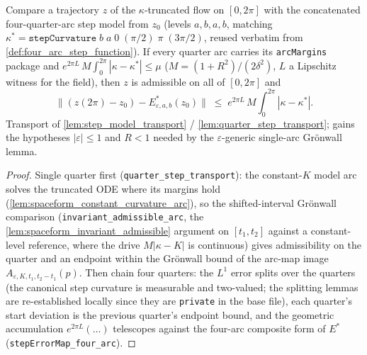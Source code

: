 \begin{lemma}
  \label{lem:spaceform_step_model_transport}
  Compare a trajectory $z$ of the $\kappa$-truncated flow on $[0,2\pi]$ with
  the concatenated four-quarter-arc step model from $z_0$ (levels $a,b,a,b$,
  matching $\kappa^\ast=\mathtt{stepCurvature}\;b\;a\;0\;(\pi/2)\;\pi\;
  (3\pi/2)$, reused verbatim from \cref{def:four_arc_step_function}). If
  every quarter arc carries its \texttt{arcMargins} package and
  $e^{2\pi L}\,M\int_0^{2\pi}|\kappa-\kappa^\ast|\le\mu$
  ($M=(1+R^2)/(2\delta^2)$, $L$ a Lipschitz witness for the field), then $z$
  is admissible on all of $[0,2\pi]$ and
  \[
    \bigl\|(z(2\pi)-z_0)-E^\ast_{\varepsilon,a,b}(z_0)\bigr\|
    \;\le\; e^{2\pi L}\,M\int_0^{2\pi}|\kappa-\kappa^\ast|.
  \]
  Transport of \cref{lem:step_model_transport} /
  \cref{lem:quarter_step_transport}; gains the hypotheses
  $|\varepsilon|\le1$ and $R<1$ needed by the $\varepsilon$-generic
  single-arc Gr\"onwall lemma.
\end{lemma}

\begin{proof}
  \leanok
  Single quarter first (\texttt{quarter\_step\_transport}): the constant-$K$
  model arc solves the truncated ODE where its margins hold
  (\cref{lem:spaceform_constant_curvature_arc}), so the
  shifted-interval Gr\"onwall comparison
  (\texttt{invariant\_admissible\_arc}, the
  \cref{lem:spaceform_invariant_admissible} argument on $[t_1,t_2]$ against
  a constant-level reference, where the drive $M|\kappa-K|$ is continuous)
  gives admissibility on the quarter and an endpoint within the Gr\"onwall
  bound of the arc-map image $A_{\varepsilon,K,t_1,t_2-t_1}(p)$. Then chain
  four quarters: the $L^1$ error splits over the quarters (the canonical
  step curvature is measurable and two-valued; the splitting lemmas are
  re-established locally since they are \texttt{private} in the base file),
  each quarter's start deviation is the previous quarter's endpoint bound,
  and the geometric accumulation
  $e^{2\pi L}(\dots)$ telescopes against the four-arc composite form of
  $E^\ast$ (\texttt{stepErrorMap\_four\_arc}).
\end{proof}

